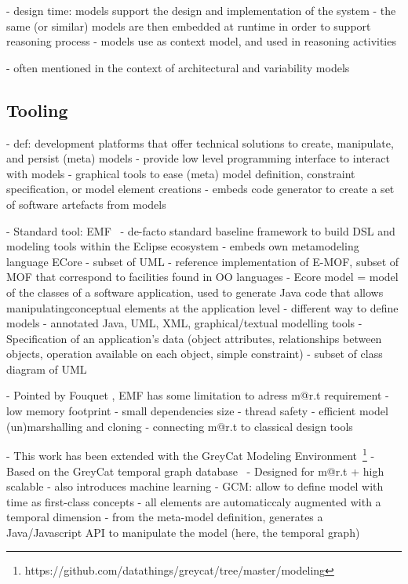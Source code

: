 - design time: models support the design and implementation of the system
- the same (or similar) models are then embedded at runtime in order to support reasoning process
- models use as context model, and used in reasoning activities

- often mentioned in the context of architectural and variability models \cite{DBLP:journals/computer/MorinBJFS09, DBLP:journals/computer/GeorgasHT09, DBLP:journals/computer/CetinaGFP09}

\subsection{Tooling}
- def: development platforms that offer technical solutions to create, manipulate, and persist (meta) models
- provide low level programming interface to interact with models
- graphical tools to ease (meta) model definition, constraint specification, or model element creations
- embeds code generator to create a set of software artefacts from models

- Standard tool: EMF~\cite{steinberg2008emf}
- de-facto standard baseline framework to build DSL and modeling tools within the Eclipse ecosystem
- embeds own metamodeling language ECore
        - subset of UML
        - reference implementation of E-MOF, subset of MOF that correspond to facilities found in OO languages
    - Ecore model = model of the classes of a software application, used to generate Java code that allows manipulatingconceptual elements  at the application level
    - different way to define models
        - annotated Java, UML, XML, graphical/textual modelling tools
- Specification of an application's data (object attributes, relationships between objects, operation available on each object, simple constraint)
            - subset of class diagram of UML
        
- Pointed by Fouquet \etal \cite{DBLP:journals/corr/FrancoisNMDBPJ14, DBLP:conf/models/FouquetNMDBPJ12}, EMF has some limitation to adress m@r.t requirement
- low memory footprint
- small dependencies size
- thread safety
- efficient model (un)marshalling and cloning
- connecting m@r.t to classical design tools 

- This work has been extended with the GreyCat Modeling Environment~\footnote{https://github.com/datathings/greycat/tree/master/modeling}
- Based on the GreyCat temporal graph database~\cite{DBLP:journals/is/HartmannFMRT19}
- Designed for m@r.t \cite{DBLP:conf/seke/0001FNMKT14, DBLP:conf/models/Moawad0FNKT15,} + high scalable \cite{DBLP:phd/basesearch/Hartmann16, DBLP:conf/seke/0001FJRT17}
- also introduces machine learning \cite{DBLP:journals/sosym/0001MFT19}
- GCM: allow to define model with time as first-class concepts
	- all elements are automaticcaly augmented with a temporal dimension
- from the meta-model definition, generates a Java/Javascript API to manipulate the model (here, the temporal graph)

